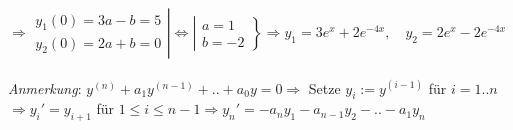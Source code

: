 \documentclass[12pt,a4paper,titlepage]{article}
\begin{document}
$\Rightarrow \left.\begin{array}{l}
  y_1(0)=3a-b=5 \\
  y_2(0)=2a+b=0
\end{array}\right| \iff \left|\begin{array}{l}
  a=1 \\ b=-2
\end{array}\right\} \Rightarrow y_1=3e^x+2e^{-4x},\quad y_2=2e^x-2e^{-4x}$ \\
\\
\textit{Anmerkung}: $y^{(n)}+a_1y^{(n-1)}+..+a_0y=0 \Rightarrow$ Setze $y_i:=y^{(i-1)}$ für $i=1..n $ \\
$\Rightarrow y_i'=y_{i+1}$ für $1\leq i\leq n-1 \Rightarrow y_n'=-a_ny_1-a_{n-1}y_2-..-a_1y_n$
\end{document}
